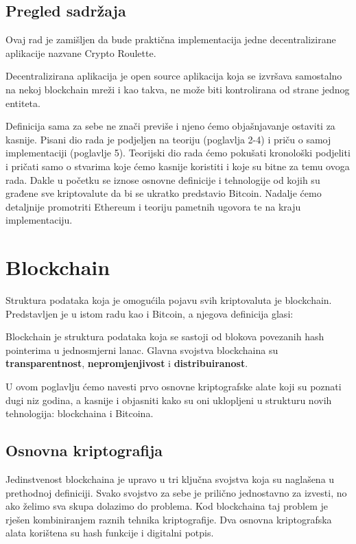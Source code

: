 \documentclass[a4paper,oneside,12pt]{memoir} %
\begin{document}
\section{Pregled sadržaja}

Ovaj rad je zamišljen da bude praktična implementacija jedne decentralizirane aplikacije nazvane Crypto Roulette.

\begin{definicija}
\label{def:dapp}
Decentralizirana aplikacija je open source aplikacija koja se izvršava samostalno na nekoj blockchain mreži i kao takva, ne može biti kontrolirana od strane jednog entiteta. 
\end{definicija}

Definicija sama za sebe ne znači previše i njeno ćemo objašnjavanje ostaviti za kasnije. Pisani dio rada je podjeljen na teoriju (poglavlja 2-4) i priču o samoj implementaciji (poglavlje 5). Teorijski dio rada ćemo pokušati kronološki podjeliti i pričati samo o stvarima koje ćemo kasnije koristiti i koje su bitne za temu ovoga rada. Dakle u početku se iznose osnovne definicije i tehnologije od kojih su građene sve kriptovalute da bi se ukratko predstavio Bitcoin. Nadalje ćemo detaljnije promotriti Ethereum i teoriju pametnih ugovora te na kraju implementaciju. 

\chapter{Blockchain}
Struktura podataka koja je omogućila pojavu svih kriptovaluta je blockchain. Predstavljen je u istom radu kao i Bitcoin\cite{bitcoin}, a njegova definicija glasi:

\begin{definicija}
\label{def:block}
Blockchain je struktura podataka koja se sastoji od blokova povezanih hash pointerima u jednosmjerni lanac. Glavna svojstva blockchaina su \textbf{transparentnost}, \textbf{nepromjenjivost} i \textbf{distribuiranost}. 
\end{definicija}

U ovom poglavlju ćemo navesti prvo osnovne kriptografske alate koji su poznati dugi niz godina, a kasnije i objasniti kako su oni uklopljeni u strukturu novih tehnologija:  blockchaina i Bitcoina.

\section{Osnovna kriptografija}
Jedinstvenost blockchaina je upravo u tri ključna svojstva koja su naglašena u prethodnoj definiciji. Svako svojstvo za sebe je prilično jednostavno za izvesti, no ako želimo sva skupa dolazimo do problema. Kod blockchaina taj problem je rješen kombiniranjem raznih tehnika kriptografije. Dva osnovna kriptografska alata korištena su hash funkcije i digitalni potpis. 
\end{document}
